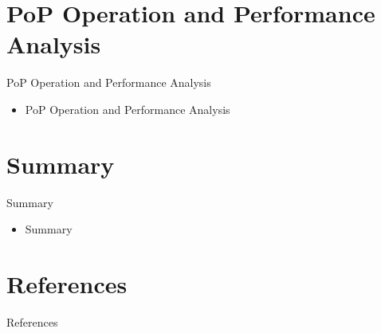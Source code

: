 \documentclass[11pt]{beamer}
\begin{document}
\section{PoP Operation and Performance Analysis}
\begin{frame}{PoP Operation and Performance Analysis}
\begin{itemize}
	\item PoP Operation and Performance Analysis
\end{itemize}
\end{frame}

\section{Summary}
\begin{frame}{Summary}
\begin{itemize}
	\item Summary
\end{itemize}
\end{frame}

\section{References}
\begin{frame}[allowframebreaks]{References}
\printbibliography
\end{frame}
\end{document}
